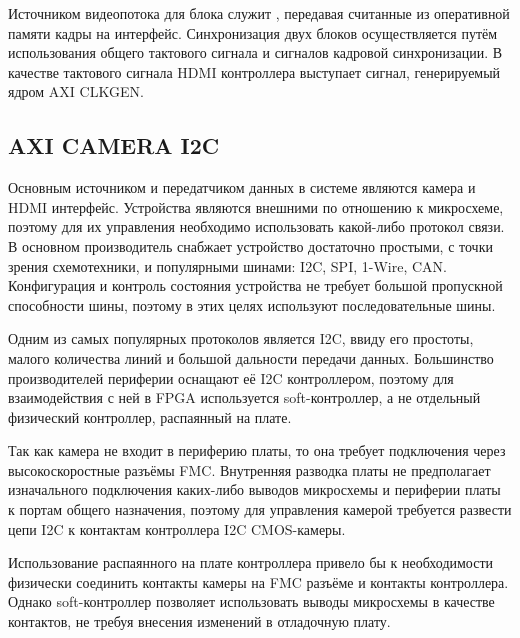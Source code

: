 Источником видеопотока для блока служит , передавая считанные из оперативной памяти
кадры на  интерфейс. Синхронизация двух блоков осуществляется путём использования
общего тактового сигнала и сигналов кадровой синхронизации. В качестве тактового сигнала HDMI контроллера
выступает сигнал, генерируемый ядром AXI CLKGEN.

\subsection{AXI CAMERA I2C}
\label{sec:functional:axi_camera_i2c}

Основным источником и передатчиком данных в системе являются камера и HDMI интерфейс.
Устройства являются внешними по отношению к микросхеме, поэтому для их управления необходимо использовать
какой-либо протокол связи. В основном производитель снабжает устройство достаточно простыми, с точки зрения
схемотехники, и популярными шинами: I2C, SPI, 1-Wire, CAN. Конфигурация и контроль состояния устройства не требует
большой пропускной способности шины, поэтому в этих целях используют последовательные шины.

Одним из самых популярных протоколов является I2C, ввиду его простоты, малого количества линий и большой
дальности передачи данных. Большинство производителей периферии оснащают её I2C контроллером, поэтому
для взаимодействия с ней в FPGA используется soft-контроллер, а не отдельный физический контроллер, распаянный
на плате.

Так как камера не входит в периферию платы, то она требует подключения через высокоскоростные разъёмы FMC.
Внутренняя разводка платы не предполагает изначального подключения каких-либо выводов микросхемы и периферии
платы к портам общего назначения, поэтому для управления камерой требуется развести цепи I2C к контактам контроллера I2C CMOS-камеры.

Использование распаянного на плате контроллера привело бы к необходимости физически соединить
контакты камеры на FMC разъёме и контакты контроллера. Однако soft-контроллер позволяет использовать
выводы микросхемы в качестве контактов, не требуя внесения изменений в отладочную плату.

